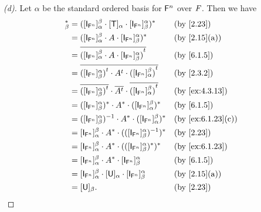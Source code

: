 \begin{proof}[(d)]
	Let \(\alpha\) be the standard ordered basis for \(\mathsf{F}^n\) over \(\mathit{F}\).
	Then we have
	\begin{align*}
		[\T]_{\beta}^* & = ([\IT[\vs{F}^n]]_{\alpha}^{\beta} \cdot [\T]_{\alpha} \cdot [\IT[\vs{F}^n]]_{\beta}^{\alpha})^*                         &  & \by{2.23}         \\
		               & = ([\IT[\vs{F}^n]]_{\alpha}^{\beta} \cdot A \cdot [\IT[\vs{F}^n]]_{\beta}^{\alpha})^*                                     &  & \by{2.15}[a]      \\
		               & = \conj{\tp{([\IT[\vs{F}^n]]_{\alpha}^{\beta} \cdot A \cdot [\IT[\vs{F}^n]]_{\beta}^{\alpha})}}                           &  & \by{6.1.5}        \\
		               & = \conj{\tp{([\IT[\vs{F}^n]]_{\beta}^{\alpha})} \cdot \tp{A} \cdot \tp{([\IT[\vs{F}^n]]_{\alpha}^{\beta})}}               &  & \by{2.3.2}        \\
		               & = \conj{\tp{([\IT[\vs{F}^n]]_{\beta}^{\alpha})}} \cdot \conj{\tp{A}} \cdot \conj{\tp{([\IT[\vs{F}^n]]_{\alpha}^{\beta})}} &  & \by{ex:4.3.13}    \\
		               & = ([\IT[\vs{F}^n]]_{\beta}^{\alpha})^* \cdot A^* \cdot ([\IT[\vs{F}^n]]_{\alpha}^{\beta})^*                               &  & \by{6.1.5}        \\
		               & = ([\IT[\vs{F}^n]]_{\beta}^{\alpha})^{-1} \cdot A^* \cdot ([\IT[\vs{F}^n]]_{\alpha}^{\beta})^*                            &  & \by{ex:6.1.23}[c] \\
		               & = [\IT[\vs{F}^n]]_{\alpha}^{\beta} \cdot A^* \cdot (([\IT[\vs{F}^n]]_{\beta}^{\alpha})^{-1})^*                            &  & \by{2.23}         \\
		               & = [\IT[\vs{F}^n]]_{\alpha}^{\beta} \cdot A^* \cdot (([\IT[\vs{F}^n]]_{\beta}^{\alpha})^*)^*                               &  & \by{ex:6.1.23}    \\
		               & = [\IT[\vs{F}^n]]_{\alpha}^{\beta} \cdot A^* \cdot [\IT[\vs{F}^n]]_{\beta}^{\alpha}                                       &  & \by{6.1.5}        \\
		               & = [\IT[\vs{F}^n]]_{\alpha}^{\beta} \cdot [\U]_{\alpha} \cdot [\IT[\vs{F}^n]]_{\beta}^{\alpha}                             &  & \by{2.15}[a]      \\
		               & = [\U]_{\beta}.                                                                                                           &  & \by{2.23}
	\end{align*}
\end{proof}

